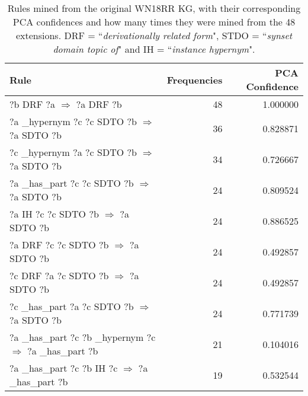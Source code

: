 \begin{table}
\begin{tabular}{lrr}
\toprule
                                                                                                      Rule &  Frequencies &  PCA Confidence \\
\midrule
                            ?b  DRF  ?a   $\Rightarrow$ ?a  DRF  ?b &           48 &        1.000000 \\
                   ?a  \_hypernym  ?c  ?c  SDTO  ?b   $\Rightarrow$ ?a  SDTO  ?b &           36 &        0.828871 \\
                   ?c  \_hypernym  ?a  ?c  SDTO  ?b   $\Rightarrow$ ?a  SDTO  ?b &           34 &        0.726667 \\
                   ?a  \_has\_part  ?c  ?c  SDTO  ?b   $\Rightarrow$ ?a  SDTO  ?b &           24 &        0.809524 \\
          ?a  IH  ?c  ?c  SDTO  ?b   $\Rightarrow$ ?a  SDTO  ?b &           24 &        0.886525 \\
?a  DRF  ?c  ?c  SDTO  ?b   $\Rightarrow$ ?a  SDTO  ?b &           24 &        0.492857 \\
?c  DRF  ?a  ?c  SDTO  ?b   $\Rightarrow$ ?a  SDTO  ?b &           24 &        0.492857 \\
                   ?c  \_has\_part  ?a  ?c  SDTO  ?b   $\Rightarrow$ ?a  SDTO  ?b &           24 &        0.771739 \\
                                               ?a  \_has\_part  ?c  ?b  \_hypernym  ?c   $\Rightarrow$ ?a  \_has\_part  ?b &           21 &        0.104016 \\
                                      ?a  \_has\_part  ?c  ?b  IH  ?c   $\Rightarrow$ ?a  \_has\_part  ?b &           19 &        0.532544 \\
\bottomrule
\end{tabular}
\caption{Rules mined from the original WN18RR KG, with their corresponding PCA confidences and how many times they were mined from the 48 extensions. DRF = ``\textit{derivationally related form}", STDO = ``\textit{synset domain topic of}" and IH = ``\textit{instance hypernym}".}
\label{wn18rr_original_rules_table_frequencies}
\end{table}

